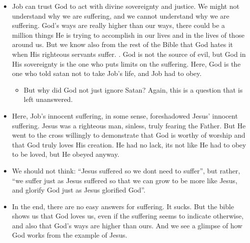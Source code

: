 \begin{itemize}
  \item{Job can trust God to act with divine sovereignty and justice. We might not understand why we are suffering, and we cannot understand why we are suffering. God’s ways are really higher than our ways, there could be a million things He is trying to accomplish in our lives and in the lives of those around us. But we know also from the rest of the Bible that God hates it when His righteous servants suffer. . God is not the source of evil, but God in His sovereignty is the one who puts limits on the suffering. Here, God is the one who told satan not to take Job’s life, and Job had to obey.
  \begin{itemize}
    \item{But why did God not just ignore Satan? Again, this is a question that is left unanswered.}
  \end{itemize}
  }
  \item{Here, Job’s innocent suffering, in some sense, foreshadowed Jesus’ innocent suffering. Jesus was a righteous man, sinless, truly fearing the Father. But He went to the cross willingly to demonstrate that God is worthy of worship and that God truly loves His creation. He had no lack, its not like He had to obey to be loved, but He obeyed anyway. }
  \item{We should not think: “Jesus suffered so we dont need to suffer”, but rather, “we suffer just as Jesus suffered so that we can grow to be more like Jesus, and glorify God just as Jesus glorified God”.}
  \item{In the end, there are no easy answers for suffering. It sucks. But the bible shows us that God loves us, even if the suffering seems to indicate otherwise, and also that God’s ways are higher than ours. And we see a glimpse of how God works from the example of Jesus.}
\end{itemize}